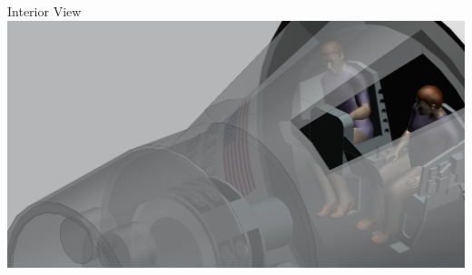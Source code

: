 \documentclass[10pt]{beamer}
\begin{document}
	\begin{frame}{Interior View}
		\includegraphics[width=\textwidth]{Interior_View.png}
	\end{frame}
\end{document}
